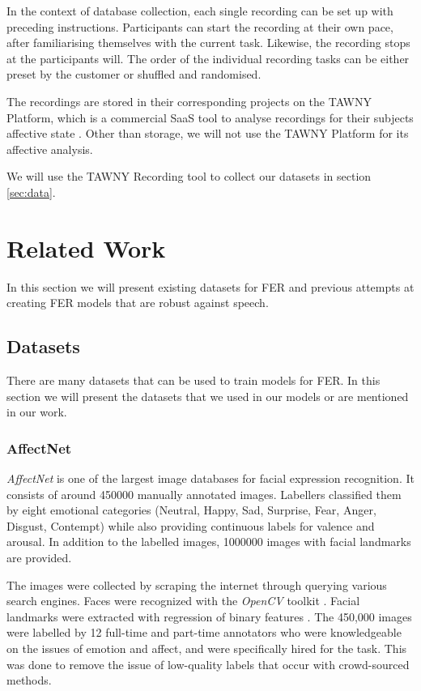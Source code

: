 In the context of database collection, each single recording can be set up with preceding instructions. Participants can start the recording at their own pace, after familiarising themselves with the current task. Likewise, the recording stops at the participants will. The order of the individual recording tasks can be either preset by the customer or shuffled and randomised.

The recordings are stored in their corresponding projects on the TAWNY Platform, which is a commercial SaaS tool to analyse recordings for their subjects affective state \cite{tawny2021platform}. Other than storage, we will not use the TAWNY Platform for its affective analysis.

We will use the TAWNY Recording tool to collect our datasets in section \ref{sec:data}.

\newpage
\section{Related Work}
In this section we will present existing datasets for FER and previous attempts at creating FER models that are robust against speech.

\subsection{Datasets}
There are many datasets that can be used to train models for FER. In this section we will present the datasets that we used in our models or are mentioned in our work.
\subsubsection{AffectNet}
\label{sec:affectnet}
\emph{AffectNet} \cite{mollahosseini2017affectnet} is one of the largest image databases for facial expression recognition. It consists of around 450000 manually annotated images. Labellers classified them by eight emotional categories (Neutral, Happy, Sad, Surprise, Fear, Anger, Disgust, Contempt) while also providing continuous labels for valence and arousal. In addition to the labelled images, 1000000 images with facial landmarks are provided.

The images were collected by scraping the internet through querying various search engines. Faces were recognized with the \emph{OpenCV} toolkit \cite{opencv_library}. Facial landmarks were extracted with regression of binary features \cite{ren2014face}. The 450,000 images were labelled by 12 full-time and part-time annotators who were knowledgeable on the issues of emotion and affect, and were specifically hired for the task. This was done to remove the issue of low-quality labels that occur with crowd-sourced methods. \cite{mollahosseini2017affectnet}

